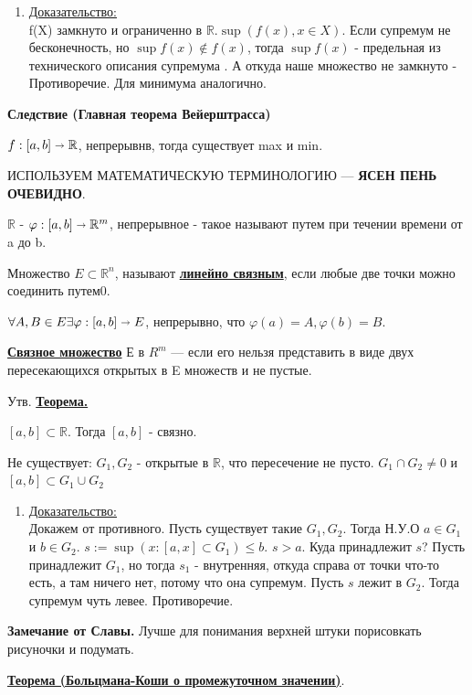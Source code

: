 \documentclass{article}
\newcommand{\deff}[1]{\underline{\textbf{#1}}}
\newcommand{\thmm}[1]{\underline{\textbf{#1}}}
\newcommand{\prooff}[1]{{\underline{Доказательство:}} \\ }
\begin{document}
\begin{enumerate}
    \item[] \prooff{}
    f(X) замкнуто и ограниченно в $\mathbb{R}$.$\sup(f(x),x\in X)$. Если супремум не бесконечность, но $\sup f(x) \notin f(x)$, тогда $\sup f(x)$ - предельная из технического описания супремума . А откуда наше множество не замкнуто - Противоречие. Для минимума аналогично.
\end{enumerate}

\textbf{Следствие (Главная теорема Вейерштрасса)}

$f: [a,b]\shortrightarrow \mathbb{R}$, непрерывнв, тогда существует max и min. 

ИСПОЛЬЗУЕМ МАТЕМАТИЧЕСКУЮ ТЕРМИНОЛОГИЮ --- \textbf{ЯСЕН ПЕНЬ ОЧЕВИДНО}.




$\mathbb{R}$ - $\varphi: [a,b] \shortrightarrow \mathbb{R}^m$, непрерывное - такое называют путем при течении времени от a до b.

Множество $E \subset \mathbb{R}^n$,  называют \deff{линейно связным}, если любые две точки можно соединить путем0.

$\forall A, B \in E \exists \varphi: [a,b] \shortrightarrow E $, непрерывно, что $\varphi(a)= A, \varphi(b) = B$.

\deff{Связное множество} Е в $R^m$ ---  если его нельзя представить в виде двух пересекающихся открытых в E множеств и не пустые.

Утв. \thmm{Теорема.}

$[a,b] \subset \mathbb{R}$. Тогда $[a,b]$ - связно. 

Не существует: $G_1,G_2$ - открытые в $\mathbb{R}$, что пересечение не пусто. $G_1 \cap G_2 \neq 0$ и $[a,b] \subset G_1 \cup  G_2  $

\begin{enumerate}
    \item[] \prooff{}
    Докажем от противного. Пусть существует такие $G_1,G_2$. Тогда Н.У.О $a \in G_1$ и $b \in G_2$. $s:= \sup(x: [a,x] \subset G_1) \leq b$. $s > a$.
    Куда принадлежит $s$? Пусть принадлежит $G_1$, но тогда $s_1$ - внутренняя, откуда справа от точки что-то есть, а там ничего нет, потому что она супремум. Пусть $s$ лежит в $G_2$. Тогда супремум чуть левее. Противоречие.
\end{enumerate}

\textbf{Замечание от Славы.} Лучше для понимания верхней штуки порисовкать рисуночки и подумать.

\thmm{Теорема (Больцмана-Коши о промежуточном значении)}.
\end{document}

